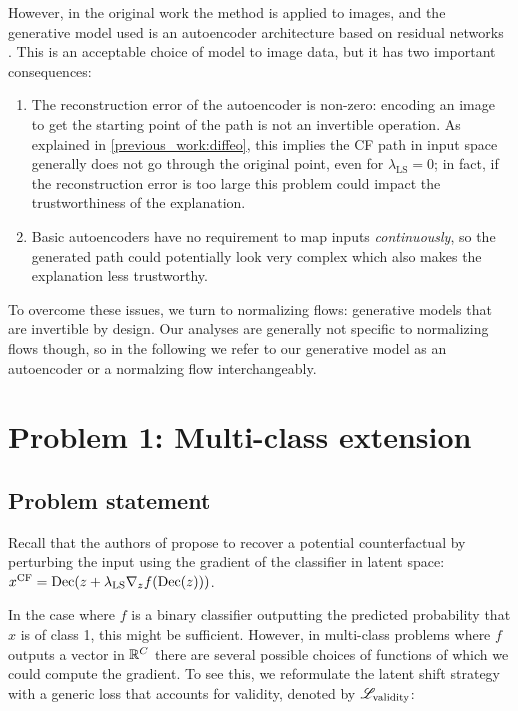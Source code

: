 \documentclass[../main.tex]{subfiles}
\begin{document}
However, in the original \ls{} work the method is applied to images, and the generative model used is an autoencoder architecture based on residual networks \cite{heDeep2015}.
This is an acceptable choice of model to image data, but it has two important consequences:
\begin{enumerate}
	\item The reconstruction error of the autoencoder is non-zero: encoding an image to get the starting point of the path is not an invertible operation.
	      As explained in \autoref{previous_work:diffeo}, this implies the CF path in input space generally does not go through the original point, even for $\lambda_\text{LS} = 0$; in fact, if the reconstruction error is too large this problem could impact the trustworthiness of the explanation.

	\item Basic autoencoders have no requirement to map inputs \emph{continuously}, so the generated path could potentially look very complex which also makes the explanation less trustworthy.
\end{enumerate}

To overcome these issues, we turn to normalizing flows: generative models that are invertible by design.
Our analyses are generally not specific to normalizing flows though, so in the following we refer to our generative model as an autoencoder or a normalzing flow interchangeably.

\section{Problem 1: Multi-class extension}

\subsection{Problem statement}

Recall that the authors of \ls{} propose to recover a potential counterfactual by perturbing the input using the gradient of the classifier in latent space: $x^\mathrm{CF} = \operatorname{Dec}(z + \lambda_\text{LS} \nabla_z f(\operatorname{Dec}(z)))$.

In the case where $f$ is a binary classifier outputting the predicted probability that $x$ is of class 1, this might be sufficient.
However, in multi-class problems where $f$ outputs a vector in $\mathbb{R}^C$ there are several possible choices of functions of which we could compute the gradient.
To see this, we reformulate the latent shift strategy with a generic loss that accounts for validity, denoted by $\mathscr{L}_\text{validity}$:
\end{document}
